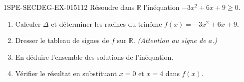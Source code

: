\begin{exercice}{1SPE-SECDEG-EX-015}{1}{12}
Résoudre dans $\mathbb{R}$ l'inéquation $-3x^2 + 6x + 9 \geqslant 0$.

\begin{enumerate}
  \item Calculer $\Delta$ et déterminer les racines du trinôme $f(x) = -3x^2 + 6x + 9$.
  \item Dresser le tableau de signes de $f$ sur $\mathbb{R}$. \textit{(Attention au signe de $a$.)}
  \item En déduire l'ensemble des solutions de l'inéquation.
  \item Vérifier le résultat en substituant $x = 0$ et $x = 4$ dans $f(x)$.
\end{enumerate}
\end{exercice}
